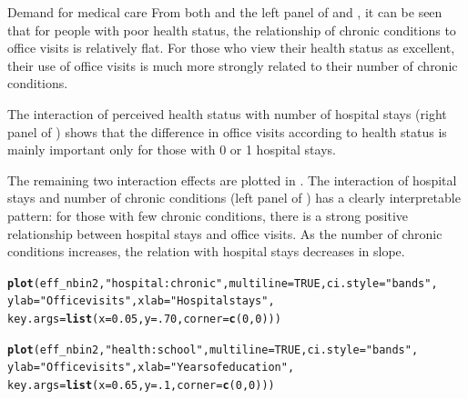 \documentclass[11pt]{book}\usepackage[]{graphicx}\usepackage[]{color}
\makeatletter
\newcommand{\hlnum}[1]{\textcolor[rgb]{0.686,0.059,0.569}{#1}}%
\newcommand{\hlstr}[1]{\textcolor[rgb]{0.192,0.494,0.8}{#1}}%
\newcommand{\hlstd}[1]{\textcolor[rgb]{0.345,0.345,0.345}{#1}}%
\newcommand{\hlkwc}[1]{\textcolor[rgb]{0.333,0.667,0.333}{#1}}%
\newcommand{\hlkwd}[1]{\textcolor[rgb]{0.737,0.353,0.396}{\textbf{#1}}}%
\newenvironment{kframe}{%
 \def\at@end@of@kframe{}%
 \ifinner\ifhmode%
  \def\at@end@of@kframe{\end{minipage}}%
  \begin{minipage}{\columnwidth}%
 \fi\fi%
 \def\FrameCommand##1{\hskip\@totalleftmargin \hskip-\fboxsep
 \colorbox{shadecolor}{##1}\hskip-\fboxsep
     \hskip-\linewidth \hskip-\@totalleftmargin \hskip\columnwidth}%
 \MakeFramed {\advance\hsize-\width
   \@totalleftmargin\z@ \linewidth\hsize
   \@setminipage}}%
 {\par\unskip\endMakeFramed%
 \at@end@of@kframe}
\newenvironment{knitrout}{}{} %
\renewenvironment{knitrout}{\small\renewcommand{\baselinestretch}{.85}}{} %
\makeatother
\begin{document}
\begin{Example}[nmes2a]{Demand for medical care}
From both  and the left panel of
and , it can be seen that for people with poor health
status, the relationship of chronic conditions to office visits is
relatively flat. For those who view their health status as excellent,
their use of office visits is much more strongly related to their number
of chronic conditions.

The interaction of perceived health status with number of
hospital stays (right panel of ) shows that
the difference in office visits according to health status is mainly
important only for those with 0 or 1 hospital stays.

The remaining two interaction effects are plotted in .
The interaction of hospital stays and number of chronic
conditions (left panel of )
has a clearly interpretable pattern: for those with few
chronic conditions, there is a strong positive relationship between
hospital stays and office visits. As the number of chronic conditions
increases, the relation with hospital stays decreases in slope.

\begin{knitrout}
\color{fgcolor}\begin{kframe}
\begin{alltt}
\hlkwd{plot}\hlstd{(eff_nbin2,} \hlstr{"hospital:chronic"}\hlstd{,} \hlkwc{multiline}\hlstd{=}\hlnum{TRUE}\hlstd{,} \hlkwc{ci.style}\hlstd{=}\hlstr{"bands"}\hlstd{,}
     \hlkwc{ylab} \hlstd{=} \hlstr{"Office visits"}\hlstd{,} \hlkwc{xlab}\hlstd{=}\hlstr{"Hospital stays"}\hlstd{,}
     \hlkwc{key.args} \hlstd{=} \hlkwd{list}\hlstd{(}\hlkwc{x} \hlstd{=} \hlnum{0.05}\hlstd{,} \hlkwc{y} \hlstd{=} \hlnum{.70}\hlstd{,} \hlkwc{corner} \hlstd{=} \hlkwd{c}\hlstd{(}\hlnum{0}\hlstd{,} \hlnum{0}\hlstd{)))}

\hlkwd{plot}\hlstd{(eff_nbin2,} \hlstr{"health:school"}\hlstd{,} \hlkwc{multiline}\hlstd{=}\hlnum{TRUE}\hlstd{,}  \hlkwc{ci.style}\hlstd{=}\hlstr{"bands"}\hlstd{,}
     \hlkwc{ylab} \hlstd{=} \hlstr{"Office visits"}\hlstd{,} \hlkwc{xlab}\hlstd{=}\hlstr{"Years of education"}\hlstd{,}
     \hlkwc{key.args} \hlstd{=} \hlkwd{list}\hlstd{(}\hlkwc{x} \hlstd{=} \hlnum{0.65}\hlstd{,} \hlkwc{y} \hlstd{=} \hlnum{.1}\hlstd{,} \hlkwc{corner} \hlstd{=} \hlkwd{c}\hlstd{(}\hlnum{0}\hlstd{,} \hlnum{0}\hlstd{)))}
\end{alltt}
\end{kframe}\begin{figure}[!htbp]


\end{figure}
\end{knitrout}
\end{Example}
\end{document}
